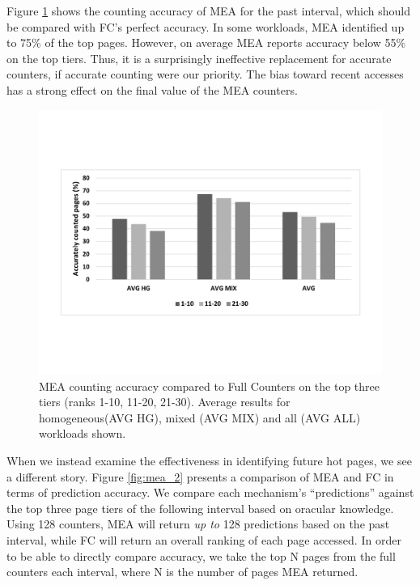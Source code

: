 
Figure \ref{fig:mea_1} shows the counting accuracy of MEA for the 
past interval, which should be compared with FC's perfect accuracy.
In some workloads, MEA identified up to 75\% of the top pages. 
However, on average MEA reports accuracy below 55\% on the top tiers. 
Thus, it is a surprisingly ineffective replacement for accurate counters,
if accurate counting were our priority.  The bias toward recent accesses
has a strong effect on the final value of the MEA counters.


\begin{figure}[t]
\centering
  \includegraphics[scale=.3]{figures/mea_1_v2.pdf}
  \caption{MEA counting accuracy compared to Full Counters on the top three tiers (ranks 1-10, 11-20, 21-30). Average results for homogeneous(AVG HG), mixed (AVG MIX) and all (AVG ALL) workloads shown.}
  \label{fig:mea_1}
\end{figure}

When we instead examine the effectiveness in identifying future hot pages,
we see a different story.  Figure \ref{fig:mea_2} presents a comparison of MEA and FC in terms of prediction accuracy. We compare each mechanism's 
``predictions'' against the top three page tiers of the following interval based on oracular knowledge. 
Using 128 counters, MEA will return \textit{up to} 128 predictions based on the past interval, while FC will return an overall ranking of each page accessed. 
In order to be able to directly compare accuracy, 
we take the top N pages from the full counters
each interval,
where N is the number of pages MEA returned.

